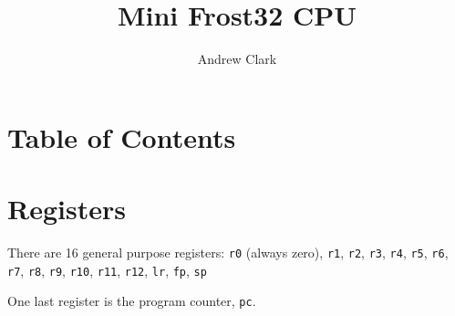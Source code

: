 \documentclass{article}
\title{Mini Frost32 CPU}
\author{Andrew Clark}
\makeatletter
\renewcommand\tableofcontents{%
    \@starttoc{toc}%
}
\makeatother
\begin{document}
	\maketitle
	\newpage


	\doublespacing
	\setcounter{section}{-1}

	\singlespacing

	\section{Table of Contents}
	\tableofcontents

	\newpage
	\doublespacing

	\section{Registers}

	There are 16 general purpose registers:
	\texttt{r0} (always zero), \texttt{r1}, \texttt{r2}, \texttt{r3},
	\texttt{r4}, \texttt{r5}, \texttt{r6}, \texttt{r7},
	\texttt{r8}, \texttt{r9}, \texttt{r10}, \texttt{r11},
	\texttt{r12}, \texttt{lr}, \texttt{fp}, \texttt{sp}

	One last register is the program counter, \texttt{pc}.

	\singlespacing
\end{document}
